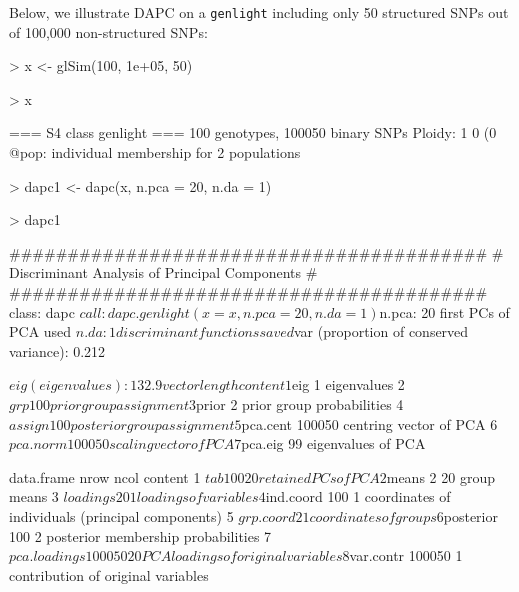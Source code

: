 \documentclass{article}
\begin{document}
Below, we illustrate DAPC on a \texttt{genlight} including only 50 structured SNPs out of 100,000
non-structured SNPs:
\begin{Schunk}
\begin{Sinput}
> x <- glSim(100, 1e+05, 50)
\end{Sinput}
\end{Schunk}
\begin{Schunk}
\begin{Sinput}
> x
\end{Sinput}
\begin{Soutput}
 === S4 class genlight ===
 100 genotypes,  100050 binary SNPs
 Ploidy: 1
 0 (0 %
 @pop: individual membership for 2 populations
\end{Soutput}
\end{Schunk}
\begin{Schunk}
\begin{Sinput}
> dapc1 <- dapc(x, n.pca = 20, n.da = 1)
\end{Sinput}
\end{Schunk}
\begin{Schunk}
\begin{Sinput}
> dapc1
\end{Sinput}
\begin{Soutput}
	#########################################
	# Discriminant Analysis of Principal Components #
	#########################################
class: dapc
$call: dapc.genlight(x = x, n.pca = 20, n.da = 1)

$n.pca: 20 first PCs of PCA used
$n.da: 1 discriminant functions saved
$var (proportion of conserved variance): 0.212

$eig (eigenvalues): 132.9  vector    length content                   
1 $eig      1      eigenvalues               
2 $grp      100    prior group assignment    
3 $prior    2      prior group probabilities 
4 $assign   100    posterior group assignment
5 $pca.cent 100050 centring vector of PCA    
6 $pca.norm 100050 scaling vector of PCA     
7 $pca.eig  99     eigenvalues of PCA        

  data.frame    nrow   ncol content                                          
1 $tab          100    20   retained PCs of PCA                              
2 $means        2      20   group means                                      
3 $loadings     20     1    loadings of variables                            
4 $ind.coord    100    1    coordinates of individuals (principal components)
5 $grp.coord    2      1    coordinates of groups                            
6 $posterior    100    2    posterior membership probabilities               
7 $pca.loadings 100050 20   PCA loadings of original variables               
8 $var.contr    100050 1    contribution of original variables               
\end{Soutput}
\end{Schunk}
\end{document}
